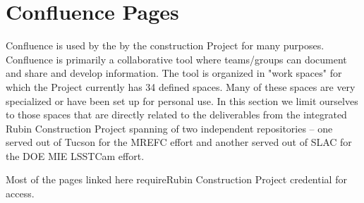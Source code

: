 \newpage
\section{Confluence Pages}

Confluence is used by the by the construction Project for many purposes.  Confluence is primarily a collaborative tool where teams/groups can document and share and develop information.  The tool is organized in "work spaces" for which the Project currently has 34 defined spaces.  Many of these spaces are very specialized or have been set up for personal use.  In this section we limit ourselves to those spaces that are directly related to the deliverables from the integrated Rubin Construction Project spanning of two independent repositories -- one served out of Tucson for the MREFC effort and another served out of SLAC for the DOE MIE LSSTCam effort.

Most of the pages linked here requireRubin Construction Project credential for access.

